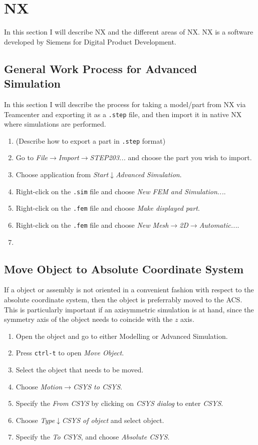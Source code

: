 \section{NX}
In this section I will describe NX and the different areas of NX. NX is a software developed by Siemens for Digital Product Development. 

\subsection{General Work Process for Advanced Simulation}
In this section I will describe the process for taking a model/part from NX via Teamcenter and exporting it as a \texttt{.step} file, and then import it in native NX where simulations are performed.

\begin{enumerate}
\item (Describe how to export a part in \texttt{.step} format)
\item Go to \emph{File}$\rightarrow$\emph{Import}$\rightarrow$\emph{STEP203...} and choose the part you wish to import.
\item Choose application from \emph{Start}$\downarrow$\emph{Advanced Simulation}.
\item Right-click on the \texttt{.sim} file and choose \emph{New FEM and Simulation...}.
\item Right-click on the \texttt{.fem} file and choose \emph{Make displayed part}.
\item Right-click on the \texttt{.fem} file and choose \emph{New Mesh}$\rightarrow$\emph{2D}$\rightarrow$\emph{Automatic...}.
\item 
\end{enumerate}

\subsection{Move Object to Absolute Coordinate System}
If a object or assembly is not oriented in a convenient fashion with respect to the absolute coordinate system, then the object is preferrably moved to the ACS. This is particularly important if an axisymmetric simulation is at hand, since the symmetry axis of the object needs to coincide with the $z$ axis.
\begin{enumerate}
\item Open the object and go to either Modelling or Advanced Simulation.
\item Press \texttt{ctrl-t} to open \emph{Move Object}.
\item Select the object that needs to be moved.
\item Choose \emph{Motion$\rightarrow$CSYS to CSYS}.
\item Specify the \emph{From CSYS} by clicking on \emph{CSYS dialog} to enter \emph{CSYS}.
\item Choose \emph{Type$\downarrow$CSYS of object} and select object.
\item Specify the \emph{To CSYS}, and choose \emph{Absolute CSYS}.
\end{enumerate}